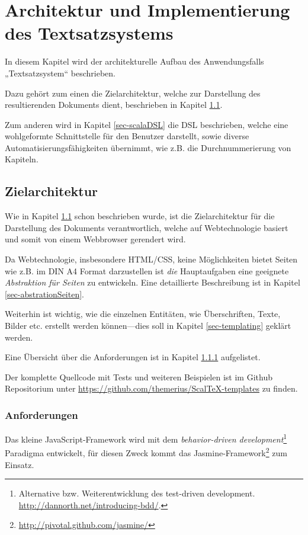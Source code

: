 \chapter{Architektur und Implementierung des Textsatzsystems}\label{ch-architektur}

In diesem Kapitel wird der architekturelle Aufbau des Anwendungsfalls
„Textsatzsystem“ beschrieben.

Dazu gehört zum einen die Zielarchitektur,
welche zur Darstellung des resultierenden Dokuments dient, beschrieben in
Kapitel \ref{sec-zielarchitektur}.

Zum anderen wird in Kapitel \ref{sec-scalaDSL} die DSL beschrieben,
welche eine wohlgeformte Schnittstelle für den Benutzer darstellt,
sowie diverse Automatisierungsfähigkeiten übernimmt, wie z.B.
die Durchnummerierung von Kapiteln.

\section{Zielarchitektur}\label{sec-zielarchitektur}

Wie in Kapitel \ref{sec-zielarchitektur} schon beschrieben wurde, ist die
Zielarchitektur für die Darstellung des Dokuments verantwortlich, welche
auf Webtechnologie basiert und somit von einem Webbrowser gerendert wird.

Da Webtechnologie, insbesondere HTML/CSS, keine Möglichkeiten bietet
Seiten wie z.B. im DIN A4 Format darzustellen ist \emph{die}
Hauptaufgaben eine geeignete \emph{Abstraktion für Seiten} zu entwickeln.
Eine detaillierte Beschreibung ist in Kapitel \ref{sec-abstrationSeiten}.

Weiterhin ist wichtig, wie die einzelnen Entitäten, wie Überschriften,
Texte, Bilder etc. erstellt werden können---dies soll in Kapitel
\ref{sec-templating} geklärt werden.

Eine Übersicht über die Anforderungen ist in Kapitel
\ref{sec-ziel_anforderungen} aufgelistet.

Der komplette Quellcode mit Tests und weiteren Beispielen ist im
Github Repositorium unter \url{https://github.com/themerius/ScalTeX-templates}
zu finden.

\subsection{Anforderungen}\label{sec-ziel_anforderungen}

Das kleine JavaScript-Framework wird mit dem
\emph{behavior-driven development}\footnote{
Alternative bzw. Weiterentwicklung des test-driven development.
\url{http://dannorth.net/introducing-bdd/}.}
Paradigma entwickelt, für diesen Zweck kommt das
Jasmine-Framework\footnote{\url{http://pivotal.github.com/jasmine/}}
zum Einsatz.


